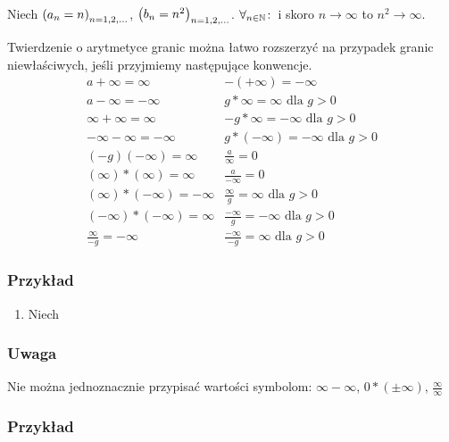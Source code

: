 \documentclass[9pt]{article}
\begin{document}
Niech $\left(a_n = n\right)_{n = 1,2,...}$, $\left(b_n = n^2\right)_{n = 1,2,...}$. $\forall_{n \in \mathbb{N}} \! : \,$ i skoro $n \to \infty$ to $n^2 \to
\infty$.

\begin{Twi}
    Twierdzenie o arytmetyce granic można łatwo rozszerzyć na przypadek granic niewłaściwych, jeśli
    przyjmiemy następujące konwencje.
    \[
        \begin{array}{ll}
            a + \infty = \infty & -(+\infty) = -\infty \\
            a - \infty = -\infty & g * \infty = \infty \text{ dla } g > 0\\
            \infty + \infty = \infty & -g * \infty = -\infty \text{ dla } g > 0\\
            -\infty - \infty = -\infty & g * (-\infty) = -\infty \text{ dla } g > 0\\
            (-g)(-\infty) = \infty & \frac{a}{\infty} = 0\\
            (\infty)*(\infty) = \infty & \frac{a}{-\infty} = 0\\
            (\infty)*(-\infty) = -\infty & \frac{\infty}{g} = \infty \text{ dla } g > 0\\
            (-\infty)*(-\infty) = \infty & \frac{-\infty}{g} = -\infty \text{ dla } g > 0\\
            \frac{\infty}{-g} = -\infty & \frac{-\infty}{-g} = \infty \text{ dla } g > 0
        \end{array}
    \]
\end{Twi}

\subsubsection*{Przykład}

\begin{enumerate}
    \item Niech 
\end{enumerate}

\subsubsection*{Uwaga}
Nie można jednoznacznie przypisać wartości symbolom: $\infty - \infty$, $0*(\pm \infty)$,
$\frac{\infty}{\infty}$

\subsubsection*{Przykład}
\end{document}
